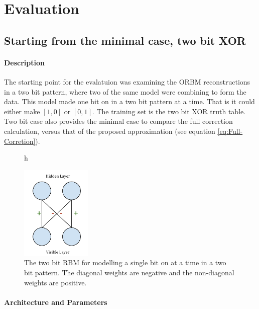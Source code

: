 \chapter{Evaluation}


\section{Starting from the minimal case, two bit XOR }

\subsubsection{Description}

The starting point for the evalatuion was examining the ORBM reconstructions in a two bit pattern, where two of the same model were combining to form the data. This model made one bit on in a two bit pattern at a time. That is it could either make $[1 , 0]$ or $[0 , 1]$. The training set is the two bit XOR truth table. Two bit case also provides the minimal case to compare the full correction calculation, versus that of the proposed approximation (see equation \ref{eq:Full-Corretion}).


\begin{figure}{h}
  \begin{center}
    \includegraphics[width=0.3\textwidth]{Assets/Two-Bit-RBM.png}
  \end{center}
  \caption{The two bit RBM for modelling a single bit on at a time in a two bit pattern. The diagonal weights are negative and the non-diagonal weights are positive.}
  \label{F:Two-Bit-RBM}
\end{figure}

\subsubsection{Architecture and Parameters}

